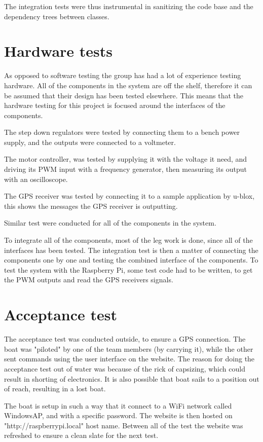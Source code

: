 The integration tests were thus instrumental in sanitizing the code base and the dependency trees between classes.

\section{Hardware tests}
As opposed to software testing the group has had a lot of experience testing hardware. All of the components in the system are off the shelf, therefore it can be assumed that their design has been tested elsewhere. This means that the hardware testing for this project is focused around the interfaces of the components.

The step down regulators were tested by connecting them to a bench power supply, and the outputs were connected to a voltmeter.

The motor controller, was tested by supplying it with the voltage it need, and driving its PWM input with a frequency generator, then measuring its output with an oscilloscope. 

The GPS receiver was tested by connecting it to a sample application by u-blox, this shows the messages the GPS receiver is outputting.

Similar test were conducted for all of the components in the system. 

To integrate all of the components, most of the leg work is done, since all of the interfaces has been tested. The integration test is then a matter of connecting the components one by one and testing the combined interface of the components. To test the system with the Raspberry Pi, some test code had to be written, to get the PWM outputs and read the GPS receivers signals.


\section{Acceptance test}
The acceptance test was conducted outside, to ensure a GPS connection. The boat was "piloted" by one of the team members (by carrying it), while the other sent commands using the user interface on the website. The reason for doing the acceptance test out of water was because of the rick of capsizing, which could result in shorting of electronics. It is also possible that boat sails to a position out of reach, resulting in a lost boat.

The boat is setup in such a way that it connect to a WiFi network called WindowsAP, and with a specific password. The website is then hosted on "http://raspberrypi.local" host name. Between all of the test the website was refreshed to ensure a clean slate for the next test.